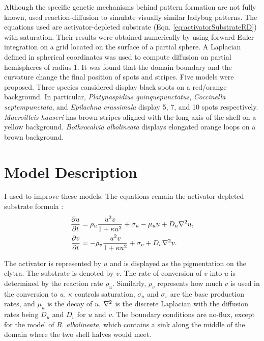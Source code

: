 Although the specific genetic mechanisms behind pattern formation are not fully known, \citet{liaw2001} used reaction-diffusion to simulate visually similar ladybug patterns. The equations used are activator-depleted substrate (Eqn. \ref{eq:activatorSubstrateRD}) with saturation. Their results were obtained numerically by using forward Euler integration on a grid located on the surface of a partial sphere. A Laplacian defined in spherical coordinates was used to compute diffusion on partial hemispheres of radius 1. It was found that the domain boundary and the curvature change the final position of spots and stripes. Five models were proposed. Three species considered display black spots on a red/orange background. In particular, \textit{Platynaspidius quinquepunctatus}, \textit{Coccinella septempunctata}, and \textit{Epilachna crassimala} display 5, 7, and 10 spots respectively. \textit{Macroilleis hauseri} has brown stripes aligned with the long axis of the shell on a yellow background. \textit{Bothrocalvia albolineata} displays elongated orange loops on a brown background.

\section{Model Description} 
I used \ProgramName{} to improve these models. The equations remain the activator-depleted substrate formula \citep{meinhardt1982}:
\begin{equation}
	\begin{aligned} \label{eq:ladybugRD}
   \frac{\partial u}{\partial t} &= \rho_u \frac{u^2v}{1+\kappa u^2} + \sigma_u - \mu_u u + D_u \nabla^2 u, \\
   \frac{\partial v}{\partial t} &= -\rho_v \frac{u^2v}{1+\kappa u^2} + \sigma_v + D_v \nabla^2 v.
	\end{aligned}
\end{equation}

The activator is represented by $u$ and is displayed as the pigmentation on the elytra. The substrate is denoted by $v$. The rate of conversion of $v$ into $u$ is determined by the reaction rate $\rho_u$. Similarly, $\rho_v$ represents how much $v$ is used in the conversion to $u$. $\kappa$ controls saturation, $\sigma_u$ and $\sigma_v$ are the base production rates, and $\mu_u$ is the decay of $u$. $\nabla^2$ is the discrete Laplacian with the diffusion rates being $D_u$ and $D_v$ for $u$ and $v$. The boundary conditions are no-flux, except for the model of  \textit{B. albolineata}, which contains a sink along the middle of the domain where the two shell halves would meet.

